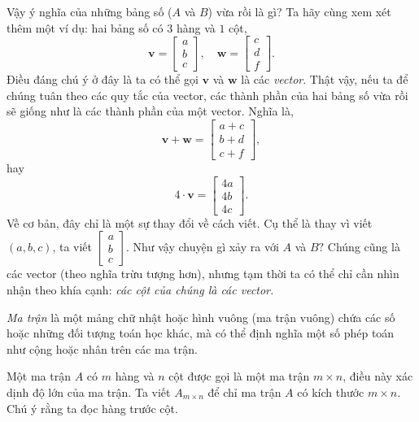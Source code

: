 Vậy ý nghĩa của những bảng số (\(A\) và \(B\)) vừa rồi là gì? Ta hãy cùng xem xét thêm một ví dụ: hai bảng số có \(3\) hàng và \(1\) cột, 
\[\mathbf{v}=\begin{bmatrix}
    a\\b\\c
\end{bmatrix}, \quad \mathbf{w}=\begin{bmatrix}
    c\\d\\f
\end{bmatrix}.
\] Điều đáng chú ý ở đây là ta có thể gọi \(\mathbf{v}\) và \(\mathbf{w}\) là các \emph{vector}. Thật vậy, nếu ta để chúng tuân theo các quy tắc của vector, các thành phần của hai bảng số vừa rồi sẽ giống như là các thành phần của một vector. 
Nghĩa là, \[\mathbf{v}+\mathbf{w}=\begin{bmatrix}
    a+c\\b+d\\c+f
\end{bmatrix},\] hay \[
    4\cdot\mathbf{v}=\begin{bmatrix}
        4a\\4b\\4c
\end{bmatrix}.\]
Về cơ bản, đây chỉ là một sự thay đổi về cách viết. Cụ thể là thay vì viết \((a,b,c)\), ta viết \(\begin{bmatrix}
    a\\b\\c
\end{bmatrix}\). Như vậy chuyện gì xảy ra với  \(A\) và \(B ?\) Chúng cũng là các vector (theo nghĩa trừu tượng hơn), nhưng tạm thời ta có thể chỉ cần nhìn nhận theo khía cạnh: \emph{các cột của chúng là các vector. }
\begin{definition}
    \emph{Ma trận} là một mảng chữ nhật hoặc hình vuông (ma trận vuông) chứa các số hoặc những đối tượng toán học khác, mà có thể định nghĩa một số phép toán như cộng hoặc nhân trên các ma trận.
\end{definition}
Một ma trận \(A\) có \(m\) hàng và \(n\) cột được gọi là một ma trận \(m\times n\), điều này xác dịnh độ lớn của ma trận. Ta viết \(A_{m\times n}\) để chỉ ma trận \(A\) có kích thước \(m\times n\). Chú ý rằng ta đọc hàng trước cột. 